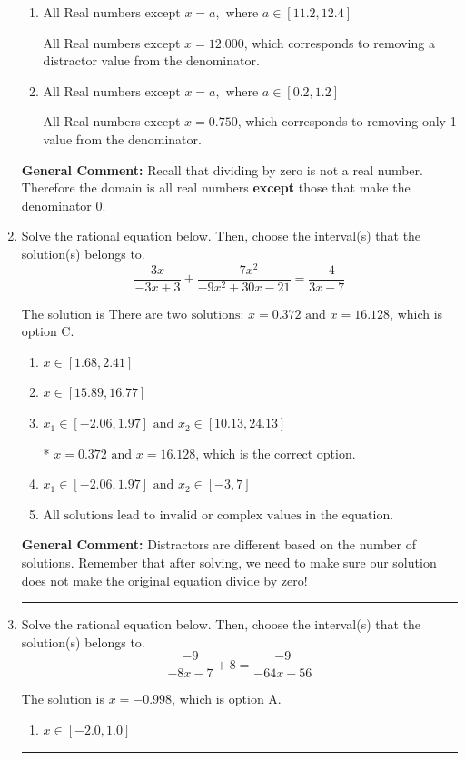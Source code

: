 \documentclass{extbook}[14pt]
\newcommand{\litem}[1]{\item #1

\rule{\textwidth}{0.4pt}}
\begin{document}
\begin{enumerate}
{\begin{enumerate}[label=\Alph*.]
All Real numbers except $x = 0.750$ and $x = 1.333$, which is the correct option.
\item \( \text{All Real numbers except } x = a, \text{ where } a \in [11.2, 12.4] \)

All Real numbers except $x = 12.000$, which corresponds to removing a distractor value from the denominator.
\item \( \text{All Real numbers except } x = a, \text{ where } a \in [0.2, 1.2] \)

All Real numbers except $x = 0.750$, which corresponds to removing only 1 value from the denominator.
\end{enumerate}

\textbf{General Comment:} Recall that dividing by zero is not a real number. Therefore the domain is all real numbers \textbf{except} those that make the denominator 0.
}
\litem{
Solve the rational equation below. Then, choose the interval(s) that the solution(s) belongs to.
\[ \frac{3x}{-3x + 3} + \frac{-7x^{2}}{-9x^{2} +30 x -21} = \frac{-4}{3x -7} \]

The solution is \( \text{There are two solutions: } x = 0.372 \text{ and } x = 16.128 \), which is option C.\begin{enumerate}[label=\Alph*.]
\item \( x \in [1.68,2.41] \)


\item \( x \in [15.89,16.77] \)


\item \( x_1 \in [-2.06, 1.97] \text{ and } x_2 \in [10.13,24.13] \)

* $x = 0.372 \text{ and } x = 16.128$, which is the correct option.
\item \( x_1 \in [-2.06, 1.97] \text{ and } x_2 \in [-3,7] \)


\item \( \text{All solutions lead to invalid or complex values in the equation.} \)


\end{enumerate}

\textbf{General Comment:} Distractors are different based on the number of solutions. Remember that after solving, we need to make sure our solution does not make the original equation divide by zero!
}
\litem{
Solve the rational equation below. Then, choose the interval(s) that the solution(s) belongs to.
\[ \frac{-9}{-8x -7} + 8 = \frac{-9}{-64x -56} \]

The solution is \( x = -0.998 \), which is option A.\begin{enumerate}[label=\Alph*.]
\item \( x \in [-2.0,1.0] \)


\end{enumerate}}
\end{enumerate}
\end{document}
